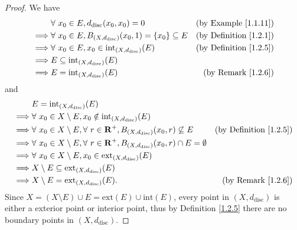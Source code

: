 \begin{proof}
    We have
    \begin{align*}
                 & \forall\ x_0 \in E, d_{\text{disc}}(x_0, x_0) = 0                          & \text{(by Example \ref{1.1.11})}   \\
        \implies & \forall\ x_0 \in E, B_{(X, d_{\text{disc}})}(x_0, 1) = \{x_0\} \subseteq E & \text{(by Definition \ref{1.2.1})} \\
        \implies & \forall\ x_0 \in E, x_0 \in \text{int}_{(X, d_{\text{disc}})}(E)           & \text{(by Definition \ref{1.2.5})} \\
        \implies & E \subseteq \text{int}_{(X, d_{\text{disc}})}(E)                                                                \\
        \implies & E = \text{int}_{(X, d_{\text{disc}})}(E)                                   & \text{(by Remark \ref{1.2.6})}
    \end{align*}
    and
    \begin{align*}
                 & E = \text{int}_{(X, d_{\text{disc}})}(E)                                                                                                              \\
        \implies & \forall\ x_0 \in X \setminus E, x_0 \notin \text{int}_{(X, d_{\text{disc}})}(E)                                                                       \\
        \implies & \forall\ x_0 \in X \setminus E, \forall\ r \in \mathbf{R}^+, B_{(X, d_{\text{disc}})}(x_0, r) \not\subseteq E    & \text{(by Definition \ref{1.2.5})} \\
        \implies & \forall\ x_0 \in X \setminus E, \forall\ r \in \mathbf{R}^+, B_{(X, d_{\text{disc}})}(x_0, r) \cap E = \emptyset                                      \\
        \implies & \forall\ x_0 \in X \setminus E, x_0 \in \text{ext}_{(X, d_{\text{disc}})}(E)                                                                          \\
        \implies & X \setminus E \subseteq \text{ext}_{(X, d_{\text{disc}})}(E)                                                                                          \\
        \implies & X \setminus E = \text{ext}_{(X, d_{\text{disc}})}(E).                                                            & \text{(by Remark \ref{1.2.6})}
    \end{align*}
    Since \(X = (X \setminus E) \cup E = \text{ext}(E) \cup \text{int}(E)\), every point in \((X, d_{\text{disc}})\) is either a exterior point or interior point, thus by Definition \ref{1.2.5} there are no boundary points in \((X, d_{\text{disc}})\).
\end{proof}


